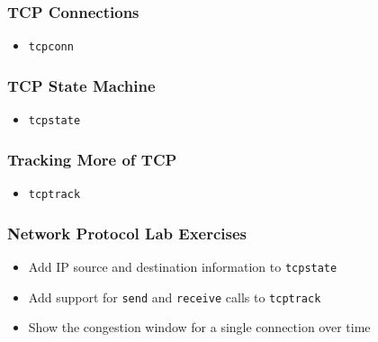 \documentclass[pdftex]{beamer} %
\begin{document}
\begin{frame}[fragile]
  \frametitle{TCP Connections}
  \begin{itemize}
  \item \verb|tcpconn|
  \end{itemize}
\end{frame}

\begin{frame}[fragile]
  \frametitle{TCP State Machine}
  \begin{itemize}
  \item \verb|tcpstate|
  \end{itemize}
\end{frame}

\begin{frame}[fragile]
  \frametitle{Tracking More of TCP}
  \begin{itemize}
  \item \verb|tcptrack|
  \end{itemize}
\end{frame}

\begin{frame}[fragile]
  \frametitle{Network Protocol Lab Exercises}
  \begin{itemize}
  \item Add IP source and destination information to \verb+tcpstate+
  \item Add support for \verb+send+ and \verb+receive+ calls to \verb+tcptrack+
  \item Show the congestion window for a single connection over time
  \end{itemize}
\end{frame}
\end{document}
